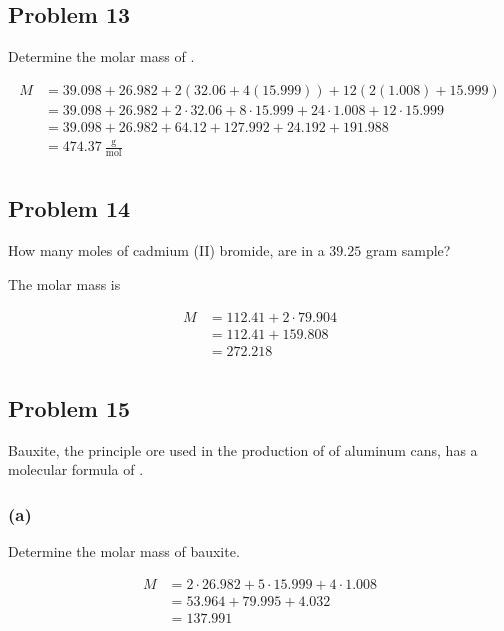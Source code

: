 \documentclass[11pt]{scrartcl}
\begin{document}
\newpage
\subsection{Problem 13}
Determine the molar mass of .

\begin{align*}
    M &= 39.098 + 26.982 + 2 \left (32.06 + 4 \left (15.999 \right) \right) + 12 \left ( 2 \left (1.008 \right) + 15.999 \right) \\
    &= 39.098 + 26.982 + 2 \cdot 32.06 + 8 \cdot 15.999 + 24 \cdot 1.008 + 12 \cdot 15.999 \\
    &= 39.098 + 26.982 + 64.12 + 127.992 + 24.192 + 191.988 \\
    &= \boxed{474.37\ \frac{\text{g}}{\text{mol}}}\\
\end{align*}

\newpage
\subsection{Problem 14}
How many moles of cadmium (II) bromide,  are in a $39.25$ gram sample?

\noindent The molar mass is

\begin{align*}
    M &= 112.41 + 2 \cdot 79.904 \\
    &= 112.41 + 159.808 \\
    &= 272.218 \\
\end{align*}

\newpage
\subsection{Problem 15}
Bauxite, the principle ore used in the production of of aluminum cans, has a molecular formula of .

\subsubsection{(a)}
Determine the molar mass of bauxite.

\begin{align*}
    M &= 2 \cdot 26.982 + 5 \cdot 15.999 + 4 \cdot 1.008 \\
    &= 53.964 + 79.995 + 4.032 \\
    &= \boxed{137.991} \\
\end{align*}
\end{document}
